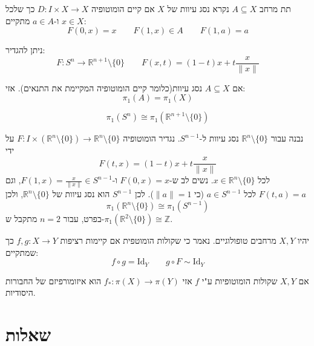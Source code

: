 \documentclass{tstextbook}
\begin{document}
\begin{definition}
תת מרחב \(A\subseteq X\) נקרא נסג עיוות של \(X\) אם קיים הומוטופיה \(D:I\times X\to X\) כך שלכל \(x \in X\) ו-\(a \in A\) מתקיים:
$$F(0,x)=x\qquad F(1,x)\in A\qquad F(1,a)=a$$

\end{definition}
\begin{example}
ניתן להגדיר:
$$F:S^{n}\to \mathbb{R}^{n+1}\setminus \{ 0 \}\qquad F(x,t)=(1-t)x+t{\frac{x}{\|x\|}}$$

\end{example}
\begin{proposition}
אם \(A\subseteq X\) נסג עיוות(כלומר קיים הומוטופיה המקיימת את התנאים). אזי:
$$\pi_{1}(A)=\pi_{1}(X)$$

\end{proposition}
\begin{corollary}
$$\pi_{1}(S^{n})\cong  \pi_{1}\left( \mathbb{R}^{n+1} \setminus \{ 0 \}\right)$$

\end{corollary}
\begin{example}
נבנה עבור \(\mathbb{R}^n \setminus \{0\}\) נסג עיוות ל-\(S^{n-1}\). נגדיר הומוטופיה \(F : I \times (\mathbb{R}^n \setminus \{0\}) \to \mathbb{R}^n \setminus \{0\}\) על ידי
$$F(t, x) = (1-t)x + t\frac{x}{\|x\|}$$
לכל \(x \in \mathbb{R}^n \setminus \{0\}\). נשים לב ש-\(F(0, x) = x\) ו-\(F(1, x) = \frac{x}{\|x\|} \in S^{n-1}\), וגם \(F(t, a) = a\) לכל \(a \in S^{n-1}\) (כי \(\|a\|=1\)). לכן \(S^{n-1}\) הוא נסג עיוות של \(\mathbb{R}^n \setminus \{0\}\), ולכן
$$\pi_1(\mathbb{R}^n \setminus \{0\}) \cong \pi_1(S^{n-1})$$
בפרט, עבור \(n=2\) מתקבל ש-\(\pi_1(\mathbb{R}^2 \setminus \{0\}) \cong \mathbb{Z}\).

\end{example}
\begin{definition}
יהיו \(X,Y\) מרחבים טופולוגיים. נאמר כי שקולות הומוטפית אם קיימות רציפות \(f,g:X\to Y\) כך שמתקיים:
$$f\circ  g = \mathrm{Id}_{Y}\qquad g\circ  F \sim \mathrm{Id}_{Y}$$

\end{definition}
\begin{proposition}
אם \(X,Y\) שקולות הומוטופיות ע"י \(f\) אזי \(f_{*}:\pi(X)\to \pi(Y)\) הוא איזומורפיזם של החבורות היסודיות.

\end{proposition}
\section{שאלות}
\end{document}
